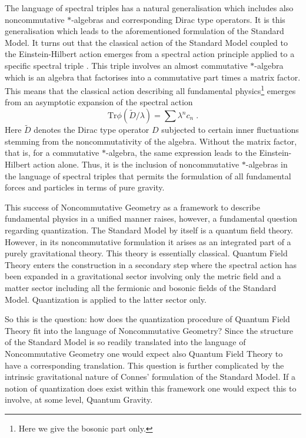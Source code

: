 \documentclass[12pt]{article}
\begin{document}
The language of spectral triples has a natural generalisation which includes also noncommutative $\ast$-algebras and corresponding Dirac type operators. It is this generalisation which leads to the aforementioned formulation of the Standard Model. It turns out that the classical action of the Standard Model coupled to the Einstein-Hilbert action emerges from a spectral action principle applied to a specific spectral triple \cite{Chamseddine:1991qh,Chamseddine:1996rw,Chamseddine:1996zu}. This triple involves an almost commutative $\ast$-algebra which is an algebra that factorises into a commutative part times a matrix factor. This means that the classical action describing all fundamental physics\footnote{Here we give the bosonic part only.} emerges from an asymptotic expansion of the spectral action
\[
\mbox{Tr}\phi(\tilde{D}/\lambda)= \sum \lambda^n c_n \;.
\]
Here $\tilde{D}$ denotes the Dirac type operator $D$ subjected to certain inner fluctuations stemming from the noncommutativity of the algebra.
Without the matrix factor, that is, for a commutative $\ast$-algebra, the same expression leads to the Einstein-Hilbert action alone. Thus, it is the inclusion of noncommutative $\ast$-algebras in the language of spectral triples that permits the formulation of all fundamental forces and particles in terms of pure gravity.



This success of Noncommutative Geometry as a framework to describe fundamental physics in a unified manner raises, however, a fundamental question regarding quantization. The Standard Model by itself is a quantum field theory. However, in its noncommutative formulation it arises as an integrated part of a purely gravitational theory. This theory is essentially classical.  Quantum Field Theory enters the construction in a secondary step where the spectral action has been expanded in a gravitational sector involving only the metric field and a matter sector including all the fermionic and bosonic fields of the Standard Model. Quantization is applied to the latter sector only.


So this is the question: how does the quantization procedure of Quantum Field Theory fit into the language of Noncommutative Geometry? Since the structure of the Standard Model is so readily translated into the language of Noncommutative Geometry one would expect also Quantum Field Theory to have a corresponding translation. This question is further complicated by the intrinsic gravitational nature of Connes' formulation of the Standard Model. If a notion of quantization does exist within this framework one would expect this to involve, at some level, Quantum Gravity.
\end{document}
